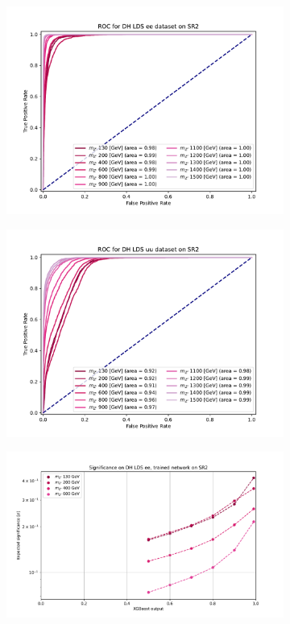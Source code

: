 \documentclass[12pt, a4paper]{book}
\begin{document}
\begin{figure}[!ht]
\begin{subfigure}[b]{0.49\textwidth}
      \includegraphics[width=1\textwidth]{XGBoost/Model_independent/100-150/DH_LDS/ROC_ee.pdf}
   \end{subfigure}
   \hfill
   \begin{subfigure}[b]{0.49\textwidth}
      \centering
      \includegraphics[width=1\textwidth]{XGBoost/Model_independent/100-150/DH_LDS/ROC_uu.pdf}
   \end{subfigure}
   \hfill
	\begin{subfigure}[b]{0.49\textwidth}
      \centering
      \includegraphics[width=1\textwidth]{XGBoost/Model_independent/100-150/DH_LDS/EXP_SIG_ee.pdf}

\end{subfigure}
\end{figure}
\end{document}

